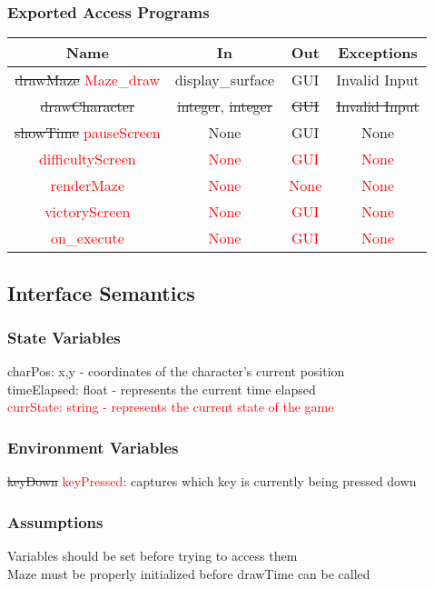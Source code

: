 \documentclass[12pt, titlepage]{article}
\begin{document}
		\subsubsection{Exported Access Programs}
		\begin{tabular}[pos]{|c|c|c|c|}
			\hline
			\textbf{Name}& \textbf{In} & \textbf{Out} & \textbf{Exceptions} \\ \hline
			\sout{drawMaze} \textcolor{red}{Maze\_draw} & display\_surface & GUI & Invalid Input \\ \hline
			\sout{drawCharacter} & \sout{integer}, \sout{integer} & \sout{GUI} & \sout{Invalid Input} \\ \hline
			\sout{showTime} \textcolor{red}{pauseScreen} & None & GUI & None \\ \hline
			\textcolor{red}{difficultyScreen} & \textcolor{red}{None} & \textcolor{red}{GUI} & \textcolor{red}{None} \\ \hline
			\textcolor{red}{renderMaze} & \textcolor{red}{None} & \textcolor{red}{None} & \textcolor{red}{None} \\ \hline
			\textcolor{red}{victoryScreen} & \textcolor{red}{None} & \textcolor{red}{GUI} & \textcolor{red}{None} \\ \hline
			\textcolor{red}{on\_execute} & \textcolor{red}{None} & \textcolor{red}{GUI} & \textcolor{red}{None} \\ \hline
		\end{tabular}
		
		\subsection{Interface Semantics}
		\subsubsection{State Variables}
		charPos: x,y - coordinates of the character's current position\\
		timeElapsed: float - represents the current time elapsed\\
		\textcolor{red}{currState: string - represents the current state of the game}
		\subsubsection{Environment Variables}
		\sout{keyDown} \textcolor{red}{keyPressed}: captures which key is currently being pressed down
		\subsubsection{Assumptions}
		Variables should be set before trying to access them \\ 
		Maze must be properly initialized before drawTime can be called
		
\end{document}
